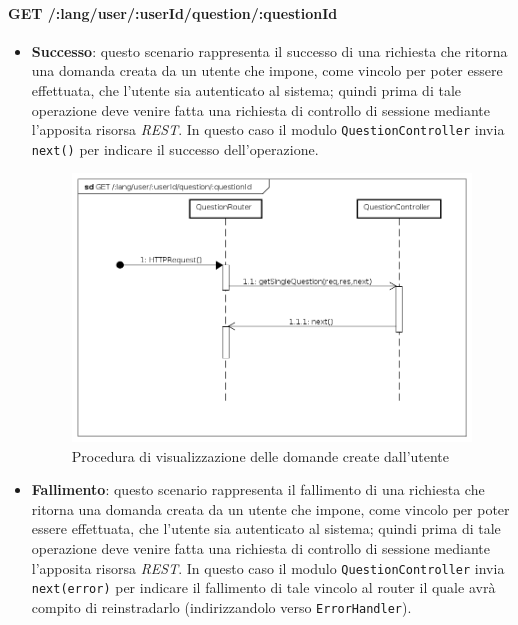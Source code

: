 \paragraph{GET /:lang/user/:userId/question/:questionId}
\begin{itemize}
\item \textbf{Successo}: questo scenario rappresenta il successo di una richiesta che ritorna una domanda creata da un utente che impone, come vincolo per poter essere effettuata, che l'utente sia autenticato al sistema; quindi prima di tale operazione deve venire fatta una richiesta di controllo di sessione mediante l'apposita risorsa \textit{REST}. In questo caso il modulo \texttt{QuestionController} invia \texttt{next()} per indicare il successo dell'operazione.


\begin{figure}[ht]
	\centering
	\includegraphics[scale=0.45]{UML/DiagrammiDiSequenza/Back-end/GET__lang_user__userId_question__questionId_success.png}
	\caption{Procedura di visualizzazione delle domande create dall'utente}
\end{figure}
\FloatBarrier

\item \textbf{Fallimento}: questo scenario rappresenta il fallimento di una richiesta che ritorna una domanda creata da un utente che impone, come vincolo per poter essere effettuata, che l'utente sia autenticato al sistema; quindi prima di tale operazione deve venire fatta una richiesta di controllo di sessione mediante l'apposita risorsa \textit{REST}. In questo caso il modulo \texttt{QuestionController} invia \texttt{next(error)} per indicare il fallimento di tale vincolo al router il quale avrà compito di reinstradarlo (indirizzandolo verso \texttt{ErrorHandler}).


\end{itemize}
